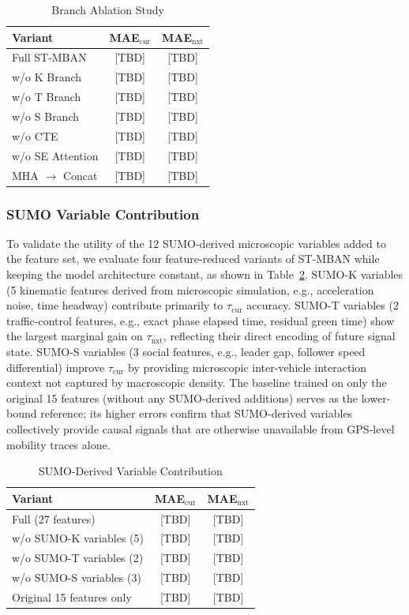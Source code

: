 \documentclass[journal]{IEEEtran}
\begin{document}
\begin{table}[!t]
\centering
\caption{Branch Ablation Study}
\label{tab:ablation_branch}
\begin{tabular}{|l|cc|}
\hline
\textbf{Variant} & \textbf{MAE$_\text{cur}$} & \textbf{MAE$_\text{nxt}$} \\
\hline
Full ST-MBAN     & [TBD] & [TBD] \\
w/o K Branch     & [TBD] & [TBD] \\
w/o T Branch     & [TBD] & [TBD] \\
w/o S Branch     & [TBD] & [TBD] \\
w/o CTE          & [TBD] & [TBD] \\
w/o SE Attention & [TBD] & [TBD] \\
MHA $\to$ Concat & [TBD] & [TBD] \\
\hline
\end{tabular}
\end{table}

\subsubsection{SUMO Variable Contribution}
To validate the utility of the 12 SUMO-derived microscopic variables added to the feature set, we evaluate four feature-reduced variants of ST-MBAN while keeping the model architecture constant, as shown in Table~\ref{tab:ablation_sumo}.
SUMO-K variables (5 kinematic features derived from microscopic simulation, e.g., acceleration noise, time headway) contribute primarily to $\tau_\text{cur}$ accuracy.
SUMO-T variables (2 traffic-control features, e.g., exact phase elapsed time, residual green time) show the largest marginal gain on $\tau_\text{nxt}$, reflecting their direct encoding of future signal state.
SUMO-S variables (3 social features, e.g., leader gap, follower speed differential) improve $\tau_\text{cur}$ by providing microscopic inter-vehicle interaction context not captured by macroscopic density.
The baseline trained on only the original 15 features (without any SUMO-derived additions) serves as the lower-bound reference; its higher errors confirm that SUMO-derived variables collectively provide causal signals that are otherwise unavailable from GPS-level mobility traces alone.

\begin{table}[!t]
\centering
\caption{SUMO-Derived Variable Contribution}
\label{tab:ablation_sumo}
\begin{tabular}{|l|cc|}
\hline
\textbf{Variant} & \textbf{MAE$_\text{cur}$} & \textbf{MAE$_\text{nxt}$} \\
\hline
Full (27 features)        & [TBD] & [TBD] \\
w/o SUMO-K variables (5)  & [TBD] & [TBD] \\
w/o SUMO-T variables (2)  & [TBD] & [TBD] \\
w/o SUMO-S variables (3)  & [TBD] & [TBD] \\
Original 15 features only & [TBD] & [TBD] \\
\hline
\end{tabular}
\end{table}
\end{document}
